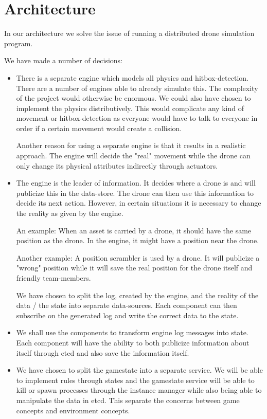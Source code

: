 \documentclass{article}
\begin{document}
\section{Architecture}
In our architecture we solve the issue of running a distributed drone simulation program.

We have made a number of decisions:
\begin{itemize}
\item There is a separate engine which models all physics and hitbox-detection. There are a number of engines able to already simulate this. The complexity of the project would otherwise be enormous. We could also have chosen to implement the physics distributively. This would complicate any kind of movement or hitbox-detection as everyone would have to talk to everyone in order if a certain movement would create a collision.

Another reason for using a separate engine is that it results in a realistic approach. The engine will decide the "real" movement while the drone can only change its physical attributes indirectly through actuators.

\item The engine is the leader of information. It decides where a drone is and will publicize this in the data-store.  The drone can then use this information to decide its next action. However, in certain situations it is necessary to change the reality as given by the engine.

An example: When an asset is carried by a drone, it should have the same position as the drone. In the engine, it might have a position near the drone.

Another example: A position scrambler is used by a drone. It will publicize a "wrong" position while it will save the real position for the drone itself and friendly team-members.

We have chosen to split the log, created by the engine, and the reality of the data / the state into separate data-sources. Each component can then subscribe on the generated log and write the correct data to the state.

\item We shall use the components to transform engine log messages into state. Each component will have the ability to both publicize information about itself through etcd and also save the information itself.

\item We have chosen to split the gamestate into a separate service. We will be able to implement rules through states and the gamestate service will be able to kill or spawn processes through the instance manager while also being able to manipulate the data in etcd. This separate the concerns between game concepts and environment concepts.


\end{itemize}
\end{document}
